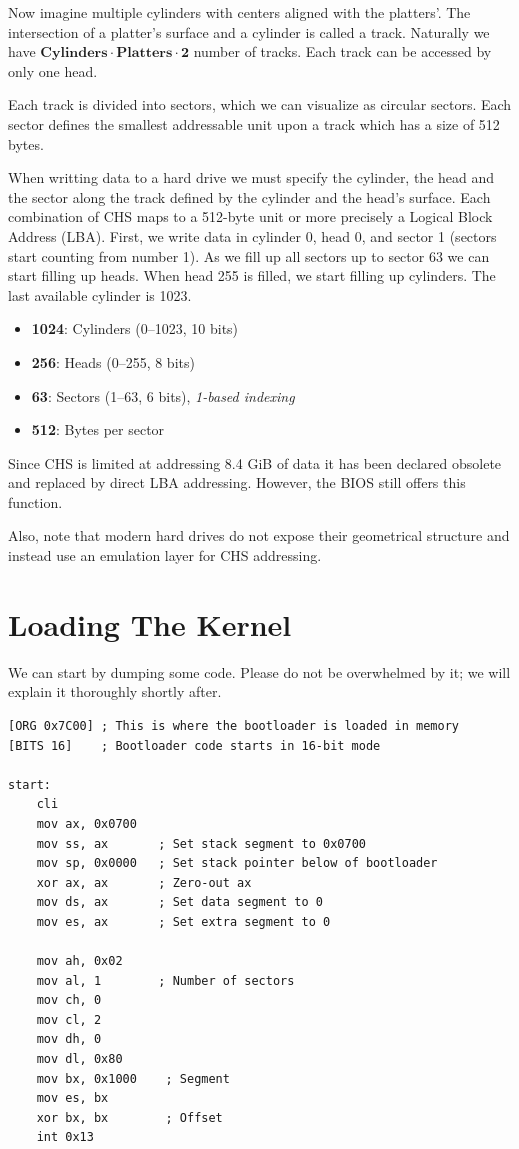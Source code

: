 Now imagine multiple cylinders with centers aligned with the platters'. The intersection of a platter's surface 
and a cylinder is called a track. Naturally we have \(\textbf{Cylinders} \cdot \textbf{Platters} \cdot \textbf{2}\)
number of tracks. Each track can be accessed by only one head.

Each track is divided into sectors, which we can visualize as circular sectors. Each sector defines the smallest addressable
unit upon a track which has a size of 512 bytes.

When writting data to a hard drive we must specify the cylinder, the head and the sector along the track defined by the
cylinder and the head's surface. Each combination of CHS maps to a 512-byte unit or more precisely a Logical Block 
Address (LBA). First, we write data in cylinder 0, head 0, and sector 1 (sectors start counting from number 1). As we 
fill up all sectors up to sector 63 we can start filling up heads. When head 255 is filled, we start filling up cylinders. The 
last available cylinder is 1023. 

\begin{itemize}
    \item \textbf{1024}: Cylinders (0–1023, 10 bits)
    \item \textbf{256}: Heads (0–255, 8 bits)
    \item \textbf{63}: Sectors (1–63, 6 bits), \textit{1-based indexing}
    \item \textbf{512}: Bytes per sector
\end{itemize}

Since CHS is limited at addressing 8.4 GiB of data it has been declared obsolete and replaced by direct LBA addressing.
However, the BIOS still offers this function.

Also, note that modern hard drives do not expose their geometrical structure and instead use an emulation layer for
CHS addressing.

\section{Loading The Kernel}

We can start by dumping some code. Please do not be overwhelmed by it; we will explain it thoroughly shortly after.

\begin{lstlisting}[caption={Simple bootloader start in assembly}]
[ORG 0x7C00] ; This is where the bootloader is loaded in memory
[BITS 16]    ; Bootloader code starts in 16-bit mode

start:
    cli
    mov ax, 0x0700
    mov ss, ax       ; Set stack segment to 0x0700
    mov sp, 0x0000   ; Set stack pointer below of bootloader
    xor ax, ax       ; Zero-out ax
    mov ds, ax       ; Set data segment to 0
    mov es, ax       ; Set extra segment to 0

    mov ah, 0x02
    mov al, 1        ; Number of sectors
    mov ch, 0
    mov cl, 2
    mov dh, 0
    mov dl, 0x80
    mov bx, 0x1000    ; Segment
    mov es, bx
    xor bx, bx        ; Offset
    int 0x13
\end{lstlisting}
    
